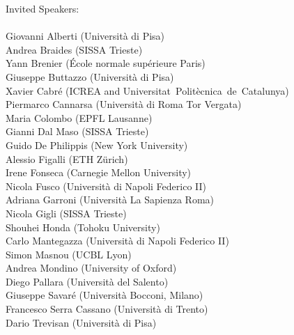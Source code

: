 \documentclass[a4paper]{article}
\newcommand{\buh}[1]{\textsf{#1}\\}
\begin{document}
\color{my}
\vspace{2cm}
\mbox{}\hspace{1cm}
\begin{minipage}{0.45\textwidth}
\Large
\buh{Invited Speakers:}
\\
\normalsize
\textsf{
Giovanni Alberti (Università di Pisa)\\
Andrea Braides (SISSA Trieste)\\
Yann Brenier (École normale supérieure Paris)\\
Giuseppe Buttazzo (Università di Pisa)\\
Xavier Cabré (ICREA and \mbox{Universitat~Politècnica~de~Catalunya)\hspace{-3cm}\mbox{}}\\
Piermarco Cannarsa (Università di Roma Tor Vergata)\\
Maria Colombo (EPFL Lausanne)\\
Gianni Dal Maso (SISSA Trieste)\\
Guido De Philippis (New York University)\\
Alessio Figalli (ETH Zürich)\\
Irene Fonseca (Carnegie Mellon University)\\
Nicola Fusco (Università di Napoli Federico II)\\
Adriana Garroni (Università La Sapienza Roma)\\
Nicola Gigli (SISSA Trieste)\\
Shouhei Honda (Tohoku University)\\
Carlo Mantegazza (Università di Napoli Federico II)\\
Simon Masnou (UCBL Lyon)\\
Andrea Mondino (University of Oxford)\\
Diego Pallara (Università del Salento)\\
Giuseppe Savaré (Università Bocconi, Milano)\\
Francesco Serra Cassano (Università di Trento)\\
Dario Trevisan (Università di Pisa)\\
}
\end{minipage}
\hspace{0cm}
\end{document}
